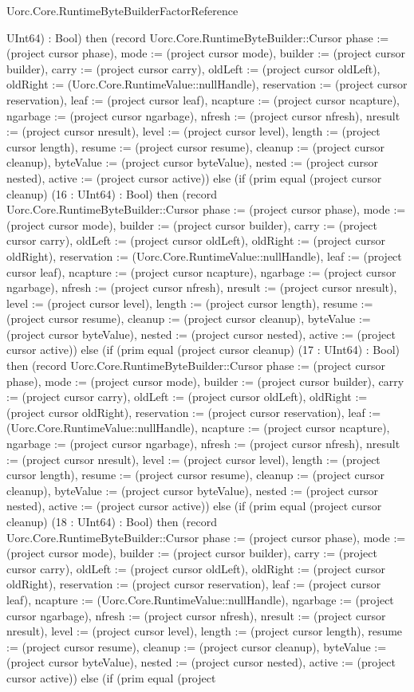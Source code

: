 \begin{lexlean}{Uorc.Core.RuntimeByteBuilderFactorReference}
\begin{semanticmodule}
{UInt64) : Bool) then (record Uorc.Core.RuntimeByteBuilder::Cursor {phase := (project cursor phase), mode := (project cursor mode), builder := (project cursor builder), carry := (project cursor carry), oldLeft := (project cursor oldLeft), oldRight := (Uorc.Core.RuntimeValue::nullHandle), reservation := (project cursor reservation), leaf := (project cursor leaf), ncapture := (project cursor ncapture), ngarbage := (project cursor ngarbage), nfresh := (project cursor nfresh), nresult := (project cursor nresult), level := (project cursor level), length := (project cursor length), resume := (project cursor resume), cleanup := (project cursor cleanup), byteValue := (project cursor byteValue), nested := (project cursor nested), active := (project cursor active)}) else (if (prim equal (project cursor cleanup) (16 : UInt64) : Bool) then (record Uorc.Core.RuntimeByteBuilder::Cursor {phase := (project cursor phase), mode := (project cursor mode), builder := (project cursor builder), carry := (project cursor carry), oldLeft := (project cursor oldLeft), oldRight := (project cursor oldRight), reservation := (Uorc.Core.RuntimeValue::nullHandle), leaf := (project cursor leaf), ncapture := (project cursor ncapture), ngarbage := (project cursor ngarbage), nfresh := (project cursor nfresh), nresult := (project cursor nresult), level := (project cursor level), length := (project cursor length), resume := (project cursor resume), cleanup := (project cursor cleanup), byteValue := (project cursor byteValue), nested := (project cursor nested), active := (project cursor active)}) else (if (prim equal (project cursor cleanup) (17 : UInt64) : Bool) then (record Uorc.Core.RuntimeByteBuilder::Cursor {phase := (project cursor phase), mode := (project cursor mode), builder := (project cursor builder), carry := (project cursor carry), oldLeft := (project cursor oldLeft), oldRight := (project cursor oldRight), reservation := (project cursor reservation), leaf := (Uorc.Core.RuntimeValue::nullHandle), ncapture := (project cursor ncapture), ngarbage := (project cursor ngarbage), nfresh := (project cursor nfresh), nresult := (project cursor nresult), level := (project cursor level), length := (project cursor length), resume := (project cursor resume), cleanup := (project cursor cleanup), byteValue := (project cursor byteValue), nested := (project cursor nested), active := (project cursor active)}) else (if (prim equal (project cursor cleanup) (18 : UInt64) : Bool) then (record Uorc.Core.RuntimeByteBuilder::Cursor {phase := (project cursor phase), mode := (project cursor mode), builder := (project cursor builder), carry := (project cursor carry), oldLeft := (project cursor oldLeft), oldRight := (project cursor oldRight), reservation := (project cursor reservation), leaf := (project cursor leaf), ncapture := (Uorc.Core.RuntimeValue::nullHandle), ngarbage := (project cursor ngarbage), nfresh := (project cursor nfresh), nresult := (project cursor nresult), level := (project cursor level), length := (project cursor length), resume := (project cursor resume), cleanup := (project cursor cleanup), byteValue := (project cursor byteValue), nested := (project cursor nested), active := (project cursor active)}) else (if (prim equal (project }
\end{semanticmodule}
\end{lexlean}
